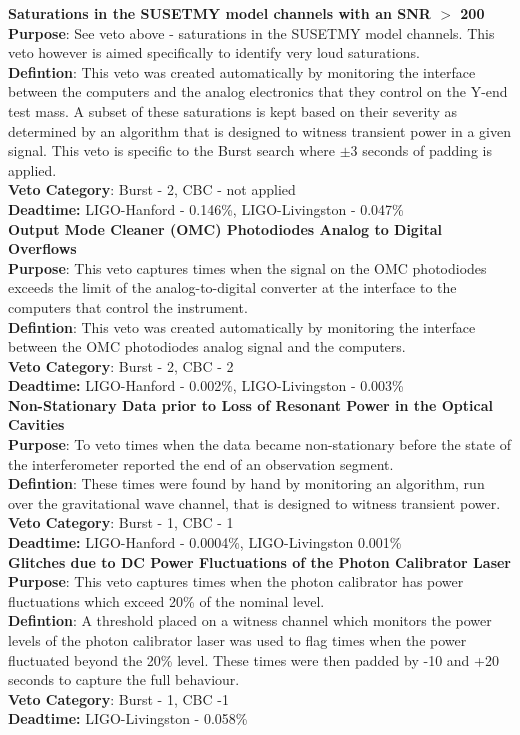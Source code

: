 \textbf{Saturations in the SUSETMY model channels with an SNR $>$ 200} \\
\textbf{Purpose}: See veto above - saturations in the SUSETMY model channels.
This veto however is aimed specifically to identify very loud saturations.\\
\textbf{Defintion}: This veto was created automatically by monitoring the
interface between the computers and the analog electronics that they control on
the Y-end test mass. A subset of these saturations is kept based on their
severity as determined by an algorithm that is designed to witness transient
power in a given signal. This veto is specific to the Burst search where
$\pm$3 seconds of padding is applied.\\
\textbf{Veto Category}: Burst - 2, CBC - not applied\\
\textbf{Deadtime:} LIGO-Hanford - 0.146\%, LIGO-Livingston - 0.047\%
\\

\textbf{Output Mode Cleaner (OMC) Photodiodes Analog to Digital Overflows} \\
\textbf{Purpose}: This veto captures times when the signal on the OMC
photodiodes exceeds the limit of the analog-to-digital converter at the
interface to the computers that control the instrument.\\
\textbf{Defintion}: This veto was created automatically by monitoring the
interface between the OMC photodiodes analog signal and the computers.\\
\textbf{Veto Category}: Burst - 2, CBC - 2\\
\textbf{Deadtime:} LIGO-Hanford - 0.002\%, LIGO-Livingston - 0.003\%
\\

\textbf{Non-Stationary Data prior to Loss of Resonant Power in the Optical Cavities} \\
\textbf{Purpose}: To veto times when the data became non-stationary before the
state of the interferometer reported the end of an observation segment.\\
\textbf{Defintion}: These times were found by hand by monitoring an algorithm,
run over the gravitational wave channel, that is designed to witness transient
power. \\
\textbf{Veto Category}: Burst - 1, CBC - 1\\
\textbf{Deadtime:} LIGO-Hanford - 0.0004\%, LIGO-Livingston 0.001\%
\\

\textbf{Glitches due to DC Power Fluctuations of the Photon Calibrator Laser} \\
\textbf{Purpose}: This veto captures times when the photon calibrator has
power fluctuations which exceed 20\% of the nominal level.\\
\textbf{Defintion}: A threshold placed on a witness channel which monitors the
power levels of the photon calibrator laser was used to flag
times when the power fluctuated beyond the 20\% level. These times were then
padded by -10 and +20 seconds to capture the full behaviour.\\
\textbf{Veto Category}: Burst - 1, CBC -1\\
\textbf{Deadtime:} LIGO-Livingston - 0.058\%
\\

